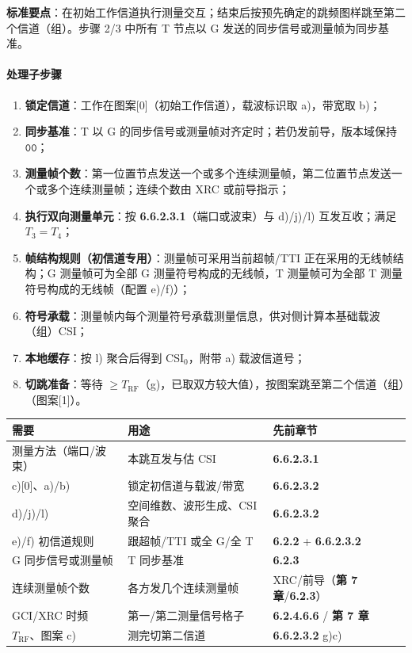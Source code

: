 \documentclass[11pt,a4paper]{ctexart}
\begin{document}
\textbf{标准要点}：在初始工作信道执行测量交互；结束后按预先确定的跳频图样跳至第二个信道（组）。步骤 2/3 中所有 T 节点以 G 发送的同步信号或测量帧为同步基准。

\paragraph{处理子步骤}
\begin{enumerate}[leftmargin=2em,nosep]
  \item \textbf{锁定信道}：工作在图案[0]（初始工作信道），载波标识取 a)，带宽取 b)；
  \item \textbf{同步基准}：T 以 G 的同步信号或测量帧对齐定时；若仍发前导，版本域保持 $\texttt{00}$；
  \item \textbf{测量帧个数}：第一位置节点发送一个或多个连续测量帧，第二位置节点发送一个或多个连续测量帧；连续个数由 XRC 或前导指示；
  \item \textbf{执行双向测量单元}：按 \textbf{6.6.2.3.1}（端口或波束）与 d)/j)/l) 互发互收；满足 $T_3=T_4$；
  \item \textbf{帧结构规则（初信道专用）}：测量帧可采用当前超帧/TTI 正在采用的无线帧结构；G 测量帧可为全部 G 测量符号构成的无线帧，T 测量帧可为全部 T 测量符号构成的无线帧（配置 e)/f)）；
  \item \textbf{符号承载}：测量帧内每个测量符号承载测量信息，供对侧计算本基础载波（组）CSI；
  \item \textbf{本地缓存}：按 l) 聚合后得到 CSI$_0$，附带 a) 载波信道号；
  \item \textbf{切跳准备}：等待 $\ge T_{\mathrm{RF}}$（g)，已取双方较大值），按图案跳至第二个信道（组）（图案[1]）。
\end{enumerate}

\begin{center}
\small
\begin{tabular}{|L{3.5cm}|L{4.5cm}|L{5cm}|}
\hline
\textbf{需要} & \textbf{用途} & \textbf{先前章节} \\
\hline
测量方法（端口/波束） & 本跳互发与估 CSI & \textbf{6.6.2.3.1} \\
\hline
c)[0]、a)/b) & 锁定初信道与载波/带宽 & \textbf{6.6.2.3.2} \\
\hline
d)/j)/l) & 空间维数、波形生成、CSI 聚合 & \textbf{6.6.2.3.2} \\
\hline
e)/f) 初信道规则 & 跟超帧/TTI 或全 G/全 T & \textbf{6.2.2} + \textbf{6.6.2.3.2} \\
\hline
G 同步信号或测量帧 & T 同步基准 & \textbf{6.2.3} \\
\hline
连续测量帧个数 & 各方发几个连续测量帧 & XRC/前导（\textbf{第 7 章}/\textbf{6.2.3}） \\
\hline
GCI/XRC 时频 & 第一/第二测量信号格子 & \textbf{6.2.4.6.6} / \textbf{第 7 章} \\
\hline
$T_{\mathrm{RF}}$、图案 c) & 测完切第二信道 & \textbf{6.6.2.3.2} g)c) \\
\hline
\end{tabular}
\end{center}
\end{document}
